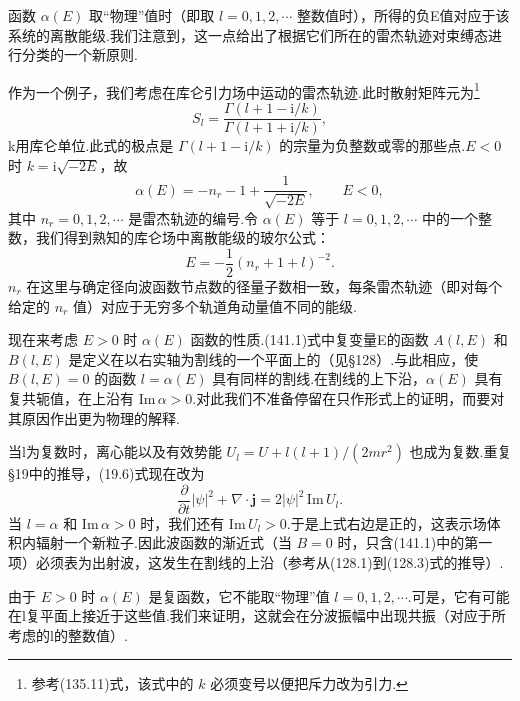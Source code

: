 函数 $\alpha(E)$ 取“物理”值时（即取 $l=0,1,2,\cdots$ 整数值时），所得的负E值对应于该系统的离散能级.我们注意到，这一点给出了根据它们所在的雷杰轨迹对束缚态进行分类的一个新原则.

作为一个例子，我们考虑在库仑引力场中运动的雷杰轨迹.此时散射矩阵元为\footnote{参考(135.11)式，该式中的 $k$ 必须变号以便把斥力改为引力.}
\begin{equation}
  S_l=\frac{\Gamma\left(l+1-\mathrm{i}/k\right)}
  {\Gamma\left(l+1+\mathrm{i}/k\right)},
\end{equation}
k用库仑单位.此式的极点是 $\Gamma(l+1-\mathrm{i}/k)$ 的宗量为负整数或零的那些点.$E<0$ 时 $k=\mathrm{i}\sqrt{-2E}$，故
\begin{equation}
  \alpha(E)=-n_r-1+\frac{1}{\sqrt{-2E}},
  \qquad E<0,
\end{equation}
其中 $n_r=0,1,2,\cdots$ 是雷杰轨迹的编号.令 $\alpha(E)$ 等于 $l=0,1,2,\cdots$ 中的一个整数，我们得到熟知的库仑场中离散能级的玻尔公式：
\begin{equation*}
  E=-\frac{1}{2}\left(n_r+1+l\right)^{-2}.
\end{equation*}
$n_r$ 在这里与确定径向波函数节点数的径量子数相一致，每条雷杰轨迹（即对每个给定的 $n_r$ 值）对应于无穷多个轨道角动量值不同的能级.

现在来考虑 $E>0$ 时 $\alpha(E)$ 函数的性质.(141.1)式中复变量E的函数 $A(l,E)$ 和 $B(l,E)$ 是定义在以右实轴为割线的一个平面上的（见§128）.与此相应，使 $B(l,E)=0$ 的函数 $l=\alpha(E)$ 具有同样的割线.在割线的上下沿，$\alpha(E)$ 具有复共轭值，在上沿有 $\mathrm{Im}\,\alpha>0$.对此我们不准备停留在只作形式上的证明，而要对其原因作出更为物理的解释.

当l为复数时，离心能以及有效势能
$U_l=U+l(l+1)/(2mr^2)$ 也成为复数.重复§19中的推导，(19.6)式现在改为
\begin{equation*}
  \frac{\partial}{\partial t}|\psi|^2+\nabla\cdot\boldsymbol{j}
  =2|\psi|^2\,\mathrm{Im}\,U_l.
\end{equation*}
当 $l=\alpha$ 和 $\mathrm{Im}\,\alpha>0$ 时，我们还有 $\mathrm{Im}\,U_l>0$.于是上式右边是正的，这表示场体积内辐射一个新粒子.因此波函数的渐近式（当 $B=0$ 时，只含(141.1)中的第一项）必须表为出射波，这发生在割线的上沿（参考从(128.1)到(128.3)式的推导）.

由于 $E>0$ 时 $\alpha(E)$ 是复函数，它不能取“物理”值 $l=0,1,2,\cdots$.可是，它有可能在l复平面上接近于这些值.我们来证明，这就会在分波振幅中出现共振（对应于所考虑的l的整数值）.

